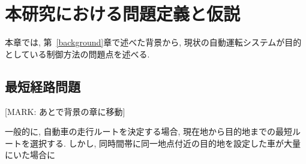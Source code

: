 \chapter{本研究における問題定義と仮説}
\label{issue}

本章では, 第~\ref{background}章で述べた背景から, 現状の自動運転システムが目的としている制御方法の問題点を述べる.

\section{最短経路問題}

[MARK: あとで背景の章に移動]

一般的に, 自動車の走行ルートを決定する場合, 現在地から目的地までの最短ルートを選択する.
しかし, 同時間帯に同一地点付近の目的地を設定した車が大量にいた場合に

